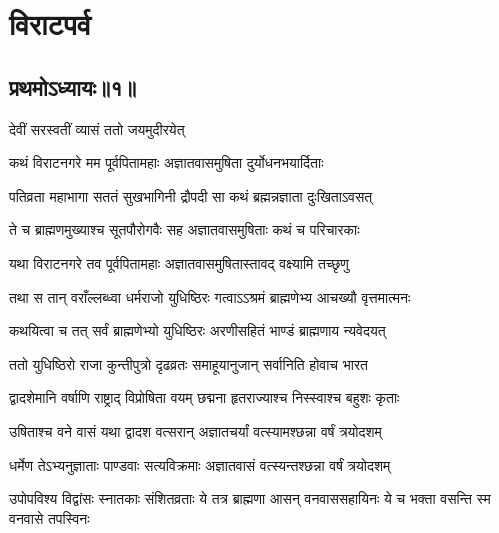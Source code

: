 \part{विराटपर्व}
\newcommand{\onelineindentedshloka}[2]{
    {#1\hspace{\shlokaspaceskip}}\mbox{}\\
\onelineshloka{\hspace{\shlokaspaceskip}#2}}

\chapter{प्रथमोऽध्यायः॥१॥}

{देवीं सरस्वतीं व्यासं ततो जयमुदीरयेत्}



\twolineshloka
{कथं विराटनगरे मम पूर्वपितामहाः}
{अज्ञातवासमुषिता दुर्योधनभयार्दिताः}


\twolineshloka
{पतिव्रता महाभागा सततं सुखभागिनी}
{द्रौपदी सा कथं ब्रह्मन्नज्ञाता दुःखिताऽवसत्}


\twolineshloka
{ते च ब्राह्मणमुख्याश्च सूतपौरोगवैः सह}
{अज्ञातवासमुषिताः कथं च परिचारकाः}



\twolineshloka
{यथा विराटनगरे तव पूर्वपितामहाः}
{अज्ञातवासमुषितास्तावद् वक्ष्यामि तच्छृणु}


\twolineshloka
{तथा स तान् वराँल्लब्ध्वा धर्मराजो युधिष्ठिरः}
{गत्वाऽऽश्रमं ब्राह्मणेभ्य आचख्यौ वृत्तमात्मनः}


\twolineshloka
{कथयित्वा च तत् सर्वं ब्राह्मणेभ्यो युधिष्ठिरः}
{अरणीसहितं भाण्डं ब्राह्मणाय न्यवेदयत्}


\twolineshloka
{ततो युधिष्ठिरो राजा कुन्तीपुत्रो दृढव्रतः}
{समाहूयानुजान् सर्वानिति होवाच भारत}


\twolineshloka
{द्वादशेमानि वर्षाणि राष्ट्राद् विप्रोषिता वयम्}
{छद्मना हृतराज्याश्च निस्स्वाश्च बहुशः कृताः}


\twolineshloka
{उषिताश्च वने वासं यथा द्वादश वत्सरान्}
{अज्ञातचर्यां वत्स्यामश्छन्ना वर्षं त्रयोदशम्}



\twolineshloka
{धर्मेण तेऽभ्यनुज्ञाताः पाण्डवाः सत्यविक्रमाः}
{अज्ञातवासं वत्स्यन्तश्छन्ना वर्षं त्रयोदशम्}


\threelineshloka
{उपोपविश्य विद्वांसः स्नातकाः संशितव्रताः}
{ये तत्र ब्राह्मणा आसन् वनवाससहायिनः}
{ये च भक्ता वसन्ति स्म वनवासे तपस्विनः}


